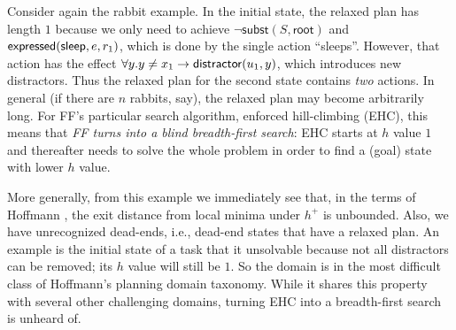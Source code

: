 Consider again the rabbit example. In the initial state, the relaxed
plan has length $1$ because we only need to achieve $\neg
\mathsf{subst}(S,\mathsf{root})$ and $\mathsf{expressed}(\mathsf{sleep},e,r_1)$,
which is done by the single action ``sleeps''. However, that action
has the effect $\forall y. y \neq x_1 \rightarrow
\mathsf{distractor}(u_1,y)$, which introduces new distractors. Thus the
relaxed plan for the second state contains \emph{two} actions. In
general (if there are $n$ rabbits, say), the relaxed plan may become
arbitrarily long.
For FF's particular search algorithm, enforced hill-climbing (EHC),
this means that {\em FF turns into a blind breadth-first search}: EHC
starts at $h$ value $1$ and thereafter needs to solve the whole
problem in order to find a (goal) state with lower $h$ value.




More generally, from this example we immediately see that, in the
terms of Hoffmann , the exit distance from
local minima under $h^+$ is unbounded. Also, we have unrecognized
dead-ends, i.e., dead-end states that have a relaxed plan. An example
is the initial state of a task that it unsolvable because not all
distractors can be removed; its $h$ value will still be $1$. So the
domain is in the most difficult class of Hoffmann's
 planning domain taxonomy. While it shares
this property with several other challenging domains, turning EHC into
a breadth-first search is unheard of.


